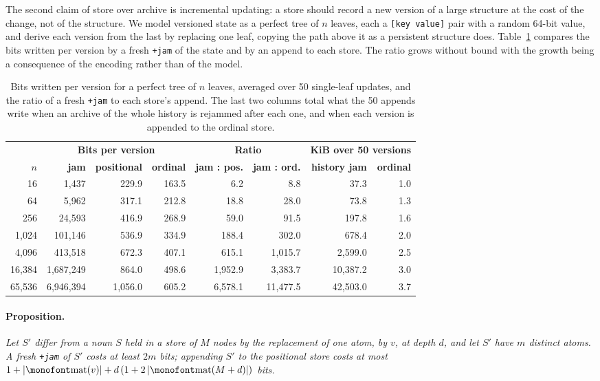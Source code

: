 \documentclass[twoside]{article}
\begin{document}
The second claim of store over archive is incremental updating:  a store should record a new version of a large structure at the cost of the change, not of the structure.  We model versioned state as a perfect tree of $n$ leaves, each a \texttt{[key value]} pair with a random 64-bit value, and derive each version from the last by replacing one leaf, copying the path above it as a persistent structure does.  Table~\ref{tab:eval-versions} compares the bits written per version by a fresh \texttt{+jam} of the state and by an append to each store.  The ratio grows without bound with the growth being a consequence of the encoding rather than of the model.

\begin{table}
\centering
\caption{Bits written per version for a perfect tree of $n$ leaves, averaged over 50 single-leaf updates, and the ratio of a fresh \texttt{+jam} to each store's append.  The last two columns total what the 50 appends write when an archive of the whole history is rejammed after each one, and when each version is appended to the ordinal store.}
\label{tab:eval-versions}
\begin{tabular}{ r r r r r r r r }
  \hline \hline
  & \multicolumn{3}{c}{\textbf{Bits per version}} & \multicolumn{2}{c}{\textbf{Ratio}} & \multicolumn{2}{c}{\textbf{KiB over 50 versions}} \\
  $n$ & \textbf{jam} & \textbf{positional} & \textbf{ordinal} & \textbf{jam : pos.} & \textbf{jam : ord.} & \textbf{history jam} & \textbf{ordinal} \\
  \hline
  16 & 1,437 & 229.9 & 163.5 & 6.2 & 8.8 & 37.3 & 1.0 \\
  64 & 5,962 & 317.1 & 212.8 & 18.8 & 28.0 & 73.8 & 1.3 \\
  256 & 24,593 & 416.9 & 268.9 & 59.0 & 91.5 & 197.8 & 1.6 \\
  1,024 & 101,146 & 536.9 & 334.9 & 188.4 & 302.0 & 678.4 & 2.0 \\
  4,096 & 413,518 & 672.3 & 407.1 & 615.1 & 1,015.7 & 2,599.0 & 2.5 \\
  16,384 & 1,687,249 & 864.0 & 498.6 & 1,952.9 & 3,383.7 & 10,387.2 & 3.0 \\
  65,536 & 6,946,394 & 1,056.0 & 605.2 & 6,578.1 & 11,477.5 & 42,503.0 & 3.7 \\
  \hline
\end{tabular}%
\end{table}

\paragraph*{Proposition.}
\textit{Let $S'$ differ from a noun $S$ held in a store of $M$ nodes by the replacement of one atom, by $v$, at depth $d$, and let $S'$ have $m$ distinct atoms.  A fresh \textup{\texttt{+jam}} of $S'$ costs at least $2m$ bits; appending $S'$ to the positional store costs at most $1 + |\textup{\texttt{mat}}(v)| + d\,(1 + 2\,|\textup{\texttt{mat}}(M + d)|)$ bits.}
\end{document}
